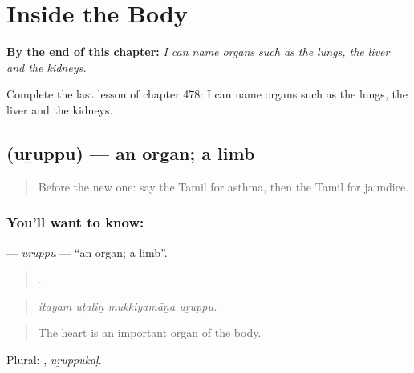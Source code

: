 
\chapter{Inside the Body}
\label{ch:ta-inside-the-body}

\begin{chapteropening}
\textbf{By the end of this chapter:} \emph{I can name organs such as the lungs, the liver and the kidneys.}

Complete the last lesson of chapter 478: I can name organs such as the lungs, the liver and the kidneys.
\end{chapteropening}

\section[\texorpdfstring{\ta{உறுப்பு} (uṟuppu)}{உறுப்பு (uṟuppu)}]{ (uṟuppu) — an organ; a limb}

\label{lesson:TA-C478-uruppu}



\begin{quote}
Before the new one: say the Tamil for asthma, then the Tamil for jaundice.
\end{quote}

\subsection*{You'll want to know: }
\textbf{} — \emph{uṟuppu} — \textquotedblleft{}an organ; a limb\textquotedblright{}.

\begin{quote}
   .
\end{quote}

\begin{quote}
\emph{itayam uṭaliṉ mukkiyamāṉa uṟuppu.}
\end{quote}

\begin{quote}
The heart is an important organ of the body.
\end{quote}

Plural: , \emph{uṟuppukaḷ}.

